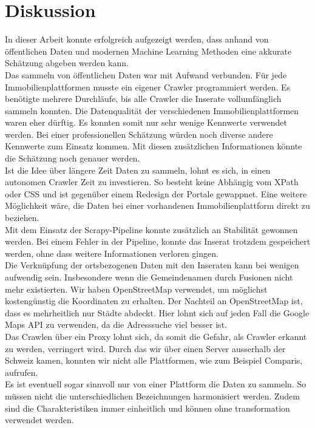 \section{Diskussion}
In dieser Arbeit konnte erfolgreich aufgezeigt werden, dass anhand von öffentlichen Daten und modernen Machine Learning Methoden eine akkurate Schätzung abgeben werden kann.\\[2ex]
%
Das sammeln von öffentlichen Daten war mit Aufwand verbunden. Für jede Immobilienplattformen musste ein eigener Crawler programmiert werden. Es benötigte mehrere Durchläufe, bis alle Crawler die Inserate vollumfänglich sammeln konnten. Die Datenqualität der verschiedenen Immobilienplattformen waren eher dürftig. Es konnten somit nur sehr wenige Kennwerte verwendet werden. Bei einer professionellen Schätzung würden noch diverse andere Kennwerte zum Einsatz kommen. Mit diesen zusätzlichen Informationen könnte die Schätzung noch genauer werden.\\
Ist die Idee über längere Zeit Daten zu sammeln, lohnt es sich, in einen autonomen Crawler Zeit zu investieren. So besteht keine Abhängig vom XPath oder CSS und ist gegenüber einem Redesign der Portale gewappnet. Eine weitere Möglichkeit wäre, die Daten bei einer vorhandenen Immobilienplattform direkt zu beziehen.\\
Mit dem Einsatz der Scrapy-Pipeline konnte zusätzlich an Stabilität gewonnen werden. Bei einem Fehler in der Pipeline, konnte das Inserat trotzdem gespeichert werden, ohne dass weitere Informationen verloren gingen.\\
%
Die Verknüpfung der ortsbezogenen Daten mit den Inseraten kann bei wenigen aufwendig sein. Insbesondere wenn die Gemeindenamen durch Fusionen nicht mehr existierten. Wir haben OpenStreetMap verwendet, um möglichst kostengünstig die Koordinaten zu erhalten. Der Nachteil an OpenStreetMap ist, dass es mehrheitlich nur Städte abdeckt. Hier lohnt sich auf jeden Fall die Google Maps API zu verwenden, da die Adresssuche viel besser ist.\\[2ex]
%
Das Crawlen über ein Proxy lohnt sich, da somit die Gefahr, als Crawler erkannt zu werden, verringert wird. Durch das wir über einen Server ausserhalb der Schweiz kamen, konnten wir nicht alle Plattformen, wie zum Beispiel Comparis, aufrufen.\\
Es ist eventuell sogar sinnvoll nur von einer Plattform die Daten zu sammeln. So müssen nicht die unterschiedlichen Bezeichnungen harmonisiert werden. Zudem sind die Charakteristiken immer einheitlich und können ohne transformation verwendet werden.

